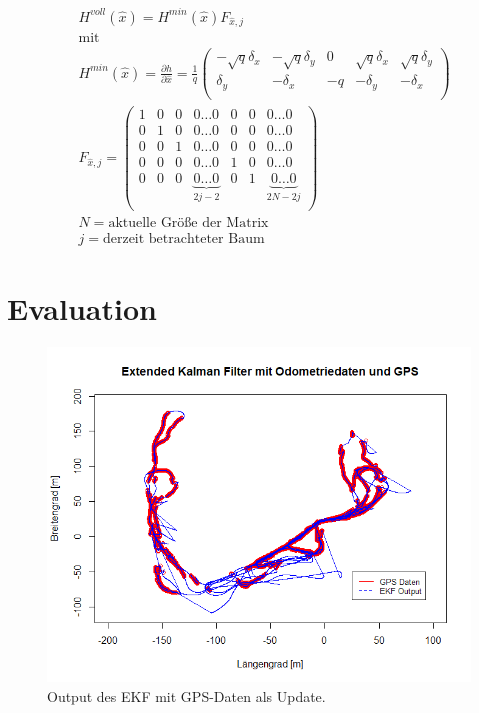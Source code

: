 \documentclass[11pt]{article}
\begin{document}
\begin{equation}\label{SLAM-Observation-Model-Jakobi-Matrix}
\begin{split}
	&H^{voll}(\hat{x}) = H^{min}(\hat{x})F_{\hat{x},j} \\
	&\text{mit} \\
	&H^{min}(\hat{x}) = \frac{\partial h}{\partial \hat{x}} = \frac{1}{q} \begin{pmatrix}
		-\sqrt{q}\delta_x & -\sqrt{q}\delta_y & 0 & \sqrt{q}\delta_x & \sqrt{q}\delta_y \\
		\delta_y & -\delta_x & -q & -\delta_y & -\delta_x\\
	\end{pmatrix} \\
	&F_{\hat{x},j} = \begin{pmatrix}
		1 & 0 & 0 & 0 \dots 0 & 0 & 0 & 0 \dots 0 \\
		0 & 1 & 0 & 0 \dots 0 & 0 & 0 & 0 \dots 0 \\
		0 & 0 & 1 & 0 \dots 0 & 0 & 0 & 0 \dots 0 \\
		0 & 0 & 0 & 0 \dots 0 & 1 & 0 & 0 \dots 0 \\
		0 & 0 & 0 & \underbrace{0 \dots 0}_{2j-2} & 0 & 1 & \underbrace{0 \dots 0}_{2N-2j} \\
	\end{pmatrix} \\
	&N= \text{aktuelle Größe der Matrix} \\
	&j= \text{derzeit betrachteter Baum}
\end{split}
\end{equation}





\section{Evaluation}\label{Evaluation}

\begin{figure}[H]
	\centering
	\includegraphics[width=4.6in]{EKF-output.png}
	\caption{Output des EKF mit GPS-Daten als Update.}
	\label{EKF-Output}
\end{figure}
\end{document}
